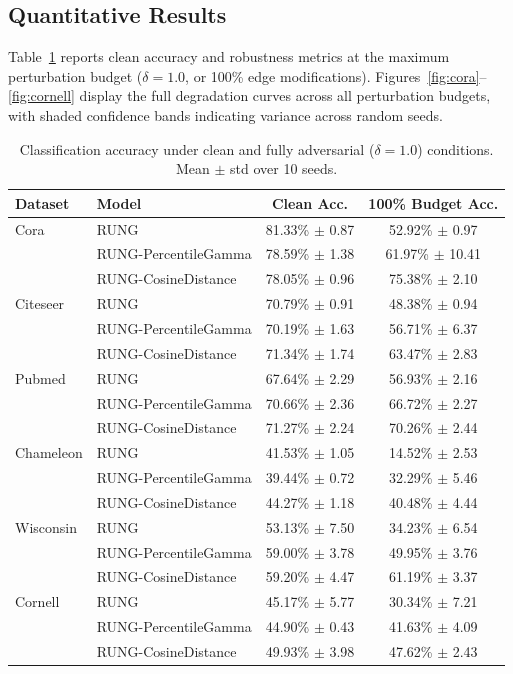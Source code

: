 \documentclass[sigconf]{acmart}
\begin{document}
\subsection{Quantitative Results}
Table~\ref{tab:final-performance} reports clean accuracy and robustness metrics at the maximum perturbation budget ($\delta = 1.0$, or 100\% edge modifications). Figures~\ref{fig:cora}--\ref{fig:cornell} display the full degradation curves across all perturbation budgets, with shaded confidence bands indicating variance across random seeds.

\begin{table}[!ht]
  \centering
  \footnotesize
  \caption{Classification accuracy under clean and fully adversarial ($\delta = 1.0$) conditions. Mean $\pm$ std over 10 seeds.}
  \label{tab:final-performance}
  \begin{tabular}{llcc}
    \toprule
    Dataset & Model & Clean Acc. & 100\% Budget Acc. \\
    \midrule
    Cora & RUNG & 81.33\% $\pm$ 0.87 & 52.92\% $\pm$ 0.97 \\
    & RUNG-PercentileGamma & 78.59\% $\pm$ 1.38 & 61.97\% $\pm$ 10.41 \\
    & RUNG-CosineDistance & 78.05\% $\pm$ 0.96 & 75.38\% $\pm$ 2.10 \\[0.25em]
    Citeseer & RUNG & 70.79\% $\pm$ 0.91 & 48.38\% $\pm$ 0.94 \\
    & RUNG-PercentileGamma & 70.19\% $\pm$ 1.63 & 56.71\% $\pm$ 6.37 \\
    & RUNG-CosineDistance & 71.34\% $\pm$ 1.74 & 63.47\% $\pm$ 2.83 \\[0.25em]
    Pubmed & RUNG & 67.64\% $\pm$ 2.29 & 56.93\% $\pm$ 2.16 \\
    & RUNG-PercentileGamma & 70.66\% $\pm$ 2.36 & 66.72\% $\pm$ 2.27 \\
    & RUNG-CosineDistance & 71.27\% $\pm$ 2.24 & 70.26\% $\pm$ 2.44 \\[0.25em]
    Chameleon & RUNG & 41.53\% $\pm$ 1.05 & 14.52\% $\pm$ 2.53 \\
    & RUNG-PercentileGamma & 39.44\% $\pm$ 0.72 & 32.29\% $\pm$ 5.46 \\
    & RUNG-CosineDistance & 44.27\% $\pm$ 1.18 & 40.48\% $\pm$ 4.44 \\[0.25em]
    Wisconsin & RUNG & 53.13\% $\pm$ 7.50 & 34.23\% $\pm$ 6.54 \\
    & RUNG-PercentileGamma & 59.00\% $\pm$ 3.78 & 49.95\% $\pm$ 3.76 \\
    & RUNG-CosineDistance & 59.20\% $\pm$ 4.47 & 61.19\% $\pm$ 3.37 \\[0.25em]
    Cornell & RUNG & 45.17\% $\pm$ 5.77 & 30.34\% $\pm$ 7.21 \\
    & RUNG-PercentileGamma & 44.90\% $\pm$ 0.43 & 41.63\% $\pm$ 4.09 \\
    & RUNG-CosineDistance & 49.93\% $\pm$ 3.98 & 47.62\% $\pm$ 2.43 \\
    \bottomrule
  \end{tabular}
\end{table}
\end{document}
